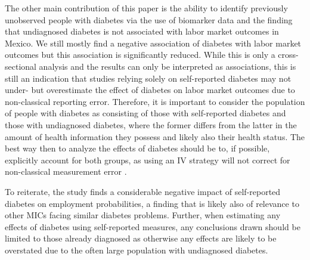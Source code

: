 \documentclass[12pt,english,british]{article}
\begin{document}
The other main contribution of this paper is the ability to identify previously unobserved people with diabetes via the use of biomarker data and the finding that undiagnosed
diabetes is not associated with labor market outcomes in Mexico. We still mostly find a negative association of diabetes with labor market outcomes but this association is significantly reduced. While this is only a cross-sectional analysis and the results can only be interpreted as associations, this is still an indication that studies relying solely on self-reported diabetes may not under- but overestimate the effect of diabetes on labor market outcomes due to non-classical reporting error. Therefore, it is important to consider the population of people with diabetes as consisting of those with self-reported diabetes and those with undiagnosed diabetes, where the former differs from the latter in the amount of health information they possess and likely also their health status. The best way then to analyze the effects of diabetes should be to, if possible, explicitly account for both groups, as using an \ac{IV} strategy will not correct for non-classical measurement error \citep{Cawley2015}.

To reiterate, the study finds a considerable negative impact of self-reported diabetes on employment probabilities, a finding that is likely also of relevance to other \ac{MICs} facing similar diabetes problems. Further, when estimating any effects of diabetes using self-reported measures, any conclusions drawn should be limited to those already diagnosed as otherwise any effects are likely to be overstated due to the often large population with undiagnosed diabetes. 
\end{document}
